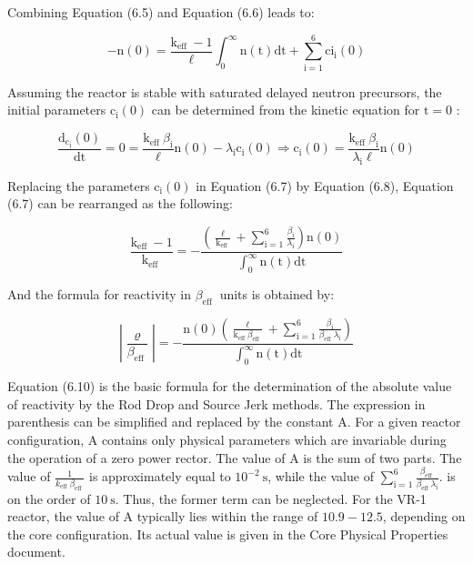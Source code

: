 \documentclass[10pt]{article}
\begin{document}
Combining Equation (6.5) and Equation (6.6) leads to:

$$
-\mathrm{n}(0)=\frac{\mathrm{k}_{\text {eff }}-1}{\ell} \int_{0}^{\infty} \mathrm{n}(\mathrm{t}) \mathrm{dt}+\sum_{\mathrm{i}=1}^{6} \mathrm{ci}_{\mathrm{i}}(0)
$$

Assuming the reactor is stable with saturated delayed neutron precursors, the initial parameters $\mathrm{c}_{\mathrm{i}}(0)$ can be determined from the kinetic equation for $\mathrm{t}=0$ :

$$
\frac{\mathrm{d}_{\mathrm{c}_{\mathrm{i}}}(0)}{\mathrm{dt}}=0=\frac{\mathrm{k}_{\text {eff }} \beta_{\mathrm{i}}}{\ell} \mathrm{n}(0)-\lambda_{\mathrm{i}} \mathrm{c}_{\mathrm{i}}(0) \Rightarrow \mathrm{c}_{\mathrm{i}}(0)=\frac{\mathrm{k}_{\text {eff }} \beta_{\mathrm{i}}}{\lambda_{\mathrm{i}} \ell} \mathrm{n}(0)
$$

Replacing the parameters $\mathrm{c}_{\mathrm{i}}(0)$ in Equation (6.7) by Equation (6.8), Equation (6.7) can be rearranged as the following:

$$
\frac{\mathrm{k}_{\text {eff }}-1}{\mathrm{k}_{\text {eff }}}=-\frac{\left(\frac{\ell}{\mathrm{k}_{\text {eff }}}+\sum_{\mathrm{i}=1}^{6} \frac{\beta_{\mathrm{i}}}{\lambda_{\mathrm{i}}}\right) \mathrm{n}(0)}{\int_{0}^{\infty} \mathrm{n}(\mathrm{t}) \mathrm{dt}}
$$

And the formula for reactivity in $\beta_{\text {eff }}$ units is obtained by:

$$
\left|\frac{\varrho}{\beta_{\text {eff }}}\right|=-\frac{\mathrm{n}(0)\left(\frac{\ell}{\mathrm{k}_{\text {eff }} \beta_{\text {eff }}}+\sum_{\mathrm{i}=1}^{6} \frac{\beta_{\mathrm{i}}}{\beta_{\text {eff }} \lambda_{\mathrm{i}}}\right)}{\int_{0}^{\infty} \mathrm{n}(\mathrm{t}) \mathrm{dt}}
$$

Equation (6.10) is the basic formula for the determination of the absolute value of reactivity by the Rod Drop and Source Jerk methods. The expression in parenthesis can be simplified and replaced by the constant A. For a given reactor configuration, A contains only physical parameters which are invariable during the operation of a zero power rector. The value of $\mathrm{A}$ is the sum of two parts. The value of $\frac{1}{k_{\text {eff }} \beta_{\text {eff }}}$ is approximately equal to $10^{-2} \mathrm{~s}$, while the value of $\sum_{\mathrm{i}=1}^{6} \frac{\beta_{\text {eff }}}{\beta_{\text {eff }} \lambda_{\mathrm{i}}}$. is on the order of $10 \mathrm{~s}$. Thus, the former term can be neglected. For the VR-1 reactor, the value of A typically lies within the range of $10.9-12.5$, depending on the core configuration. Its actual value is given in the Core Physical Properties document.
\end{document}

